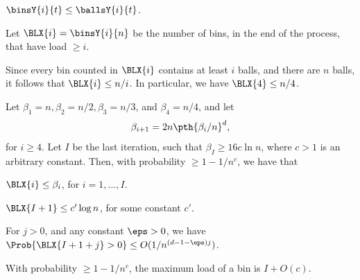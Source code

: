 \begin{observation}
    $\binsY{i}{t} \leq \ballsY{i}{t}$.
\end{observation}

\newcommand{\BadEvent}{\mathcal{B}}%
\newcommand{\GoodEvent}{\mathcal{G}}%


Let $\BLX{i} = \binsY{i}{n}$ be the number of bins, in the end of the
process, that have load $\geq i$.

\begin{observation}
    Since every bin counted in $\BLX{i}$ contains at least $i$ balls,
    and there are $n$ balls, it follows that $\BLX{i} \leq n/i$.  In
    particular, we have $\BLX{4} \leq n/4$.
\end{observation}


\begin{lemma}
    Let $\beta_1 = n, \beta_2 = n/2, \beta_3=n/3$, and
    $\beta_4 = n/4$, and let
    \begin{equation*}
        \beta_{i+1} = 2 n \pth{\beta_i/n}^d,
    \end{equation*}
    for $i\geq 4$.  Let $I$ be the last iteration, such that
    $\beta_{I} \geq 16c\ln n$, where $c> 1$ is an arbitrary
    constant. Then, with probability $\geq 1-1/n^c$, we have that
    \begin{compactenumA}
        \item $\BLX{i} \leq \beta_i$, for $i=1,\ldots, I$.
        \item $\BLX{I+1} \leq c' \log n$, for some constant $c'$. %
        \item For $j > 0$, and any constant $\eps > 0$, we have
        $\Prob{ \BLX{I+1+j} > 0} \leq O(1/n^{(d-1-\eps)j})$.

        \item With probability $\geq 1-1/n^c$, the maximum load of a
        bin is $I+O(c)$.
    \end{compactenumA}
\end{lemma}

